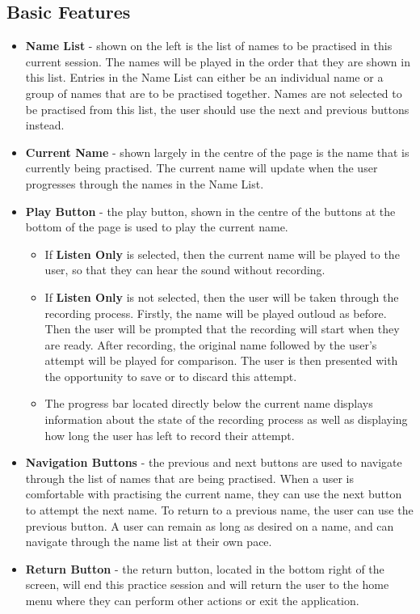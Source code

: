 \documentclass{article}
\begin{document}
\subsection{Basic Features}

\begin{itemize}
	\item \textbf{Name List} - shown on the left is the list of names to be practised in this current session. The names will be played in the order that 
they are shown in this list. Entries in the Name List can either be an individual name or a group of names that are to 
be practised together. Names are not selected to be practised from this list, the user should use the next and previous buttons instead.

	\item \textbf{Current Name} - shown largely in the centre of the page is the name that is currently being practised. The current name
will update when the user progresses through the names in the Name List.

	\item \textbf{Play Button} - the play button, shown in the centre of the buttons at the bottom of the page is used to play the current name.

	\begin{itemize}
		\item If \textbf{Listen Only} is selected, then the current name will be played to the user, so that they can hear the sound without recording.

		\item If \textbf{Listen Only} is not selected, then the user will be taken through the recording process. Firstly, the name will be played outloud
    as before. Then the user will be prompted that the recording will start when they are ready. After recording, the original name 
    followed by the user's attempt will be played for comparison. The user is then presented with the opportunity to save or to discard
    this attempt.

    	\item The progress bar located directly below the current name displays information about the state of the recording process
    as well as displaying how long the user has left to record their attempt.
	\end{itemize}

	\item \textbf{Navigation Buttons} - the previous and next buttons are used to navigate through the list of names that are being 
practised. When a user is comfortable with practising the current name, they can use the next button to attempt the next name. 
To return to a previous name, the user can use the previous button. A user can remain as long as desired on a name, and can 
navigate through the name list at their own pace.

	\item \textbf{Return Button} - the return button, located in the bottom right of the screen, will end this practice session and will
return the user to the home menu where they can perform other actions or exit the application.


\end{itemize}
\end{document}
